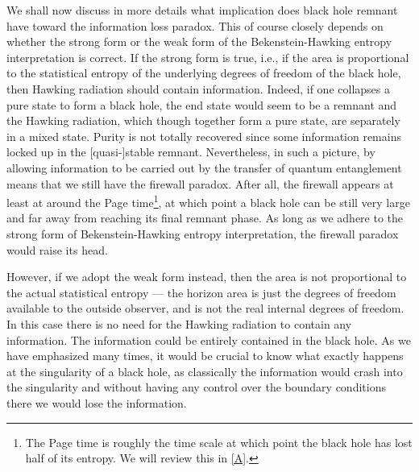 \documentclass[12pt]{article}
\newcommand{\2}{$^2$}
\newcommand{\3}{$^3$}
\newcommand{\4}{$_4$}
\newcommand{\5}{$_5$}
\begin{document}
We shall now discuss in more details what implication does black hole remnant have toward the information loss paradox. This of course closely depends on whether the strong form or the weak form of the Bekenstein-Hawking entropy interpretation is correct. If the strong form is true, i.e., if the area is proportional to the statistical entropy of the underlying degrees of freedom of the black hole, then Hawking radiation should contain information. Indeed, if one collapses a pure state to form a black hole, the end state would seem to be a
remnant and the Hawking radiation, which though together form a pure state, are separately in a mixed state. Purity is not totally recovered since some information remains locked up in the [quasi-]stable remnant. Nevertheless, in such a picture, by allowing information to be carried out by the transfer of quantum entanglement means that we still have the firewall paradox. After all, the firewall appears at least at around the Page time\footnote{The Page time is roughly the time scale at which point the black hole has lost half of its entropy. We will review this in \ref{A}.}, at which point a black hole can be still very large and far away from reaching its final remnant phase. As long as we adhere to the strong form of Bekenstein-Hawking entropy interpretation, the firewall paradox would raise its head. 

However, if we adopt the weak form instead, then the area is not proportional to the actual statistical entropy --- the horizon area is just the degrees of freedom available to the outside observer, and is not the real internal degrees of freedom. In this case there is no need for the Hawking radiation to contain any information. 
The information could be entirely contained in the black hole. As we have emphasized many times, it would be crucial to know what exactly happens at the singularity of a black hole, as classically the information would crash into the singularity and without having any control over the boundary conditions there we would lose the information. %
\end{document}
